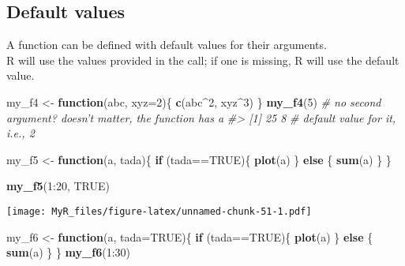 \documentclass[]{book}
\newenvironment{Shaded}{}{}
\newcommand{\CommentTok}[1]{\textcolor[rgb]{0.38,0.63,0.69}{\textit{#1}}}
\newcommand{\ControlFlowTok}[1]{\textcolor[rgb]{0.00,0.44,0.13}{\textbf{#1}}}
\newcommand{\DataTypeTok}[1]{\textcolor[rgb]{0.56,0.13,0.00}{#1}}
\newcommand{\DecValTok}[1]{\textcolor[rgb]{0.25,0.63,0.44}{#1}}
\newcommand{\KeywordTok}[1]{\textcolor[rgb]{0.00,0.44,0.13}{\textbf{#1}}}
\newcommand{\NormalTok}[1]{#1}
\newcommand{\OperatorTok}[1]{\textcolor[rgb]{0.40,0.40,0.40}{#1}}
\newcommand{\OtherTok}[1]{\textcolor[rgb]{0.00,0.44,0.13}{#1}}
\newcommand{\StringTok}[1]{\textcolor[rgb]{0.25,0.44,0.63}{#1}}
\theoremstyle{definition}
\theoremstyle{definition}
\theoremstyle{definition}
\theoremstyle{remark}
\begin{document}
\hypertarget{default-values}{%
\subsection{Default values}\label{default-values}}

A function can be defined with default values for their arguments.\\
R will use the values provided in the call; if one is missing, R will
use the default value.

\begin{Shaded}
\begin{Highlighting}[]

\NormalTok{my_f4 <-}\StringTok{ }\ControlFlowTok{function}\NormalTok{(abc, }\DataTypeTok{xyz=}\DecValTok{2}\NormalTok{)\{}
  \KeywordTok{c}\NormalTok{(abc}\OperatorTok{^}\DecValTok{2}\NormalTok{, xyz}\OperatorTok{^}\DecValTok{3}\NormalTok{)}
\NormalTok{\}}
\KeywordTok{my_f4}\NormalTok{(}\DecValTok{5}\NormalTok{) }\CommentTok{# no second argument? doesn't matter, the function has a }
\CommentTok{#> [1] 25  8}
\CommentTok{# default value for it, i.e., 2}

\NormalTok{my_f5 <-}\StringTok{ }\ControlFlowTok{function}\NormalTok{(a, tada)\{}
  \ControlFlowTok{if}\NormalTok{ (tada}\OperatorTok{==}\OtherTok{TRUE}\NormalTok{)\{}
    \KeywordTok{plot}\NormalTok{(a)}
\NormalTok{  \} }\ControlFlowTok{else}\NormalTok{ \{}
    \KeywordTok{sum}\NormalTok{(a)}
\NormalTok{  \}}
\NormalTok{\}}


\KeywordTok{my_f5}\NormalTok{(}\DecValTok{1}\OperatorTok{:}\DecValTok{20}\NormalTok{, }\OtherTok{TRUE}\NormalTok{)}
\end{Highlighting}
\end{Shaded}

\texttt{[image: MyR\_files/figure-latex/unnamed-chunk-51-1.pdf]}

\begin{Shaded}
\begin{Highlighting}[]

\NormalTok{my_f6 <-}\StringTok{ }\ControlFlowTok{function}\NormalTok{(a, }\DataTypeTok{tada=}\OtherTok{TRUE}\NormalTok{)\{}
  \ControlFlowTok{if}\NormalTok{ (tada}\OperatorTok{==}\OtherTok{TRUE}\NormalTok{)\{}
    \KeywordTok{plot}\NormalTok{(a)}
\NormalTok{  \} }\ControlFlowTok{else}\NormalTok{ \{}
    \KeywordTok{sum}\NormalTok{(a)}
\NormalTok{  \}}
\NormalTok{\}}
\KeywordTok{my_f6}\NormalTok{(}\DecValTok{1}\OperatorTok{:}\DecValTok{30}\NormalTok{)}
\end{Highlighting}
\end{Shaded}
\end{document}
